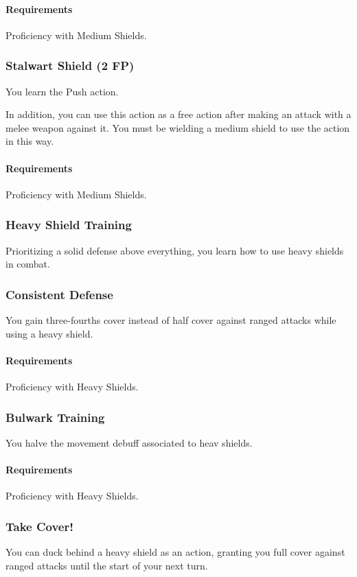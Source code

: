     \paragraph{Requirements} Proficiency with Medium Shields.
\subsubsection{Stalwart Shield (2 FP)} \label{feat::stalwartshield}
    You learn the Push action.

    In addition, you can use this action as a free action after making an attack with a melee weapon against it.
    You must be wielding a medium shield to use the action in this way.
    \paragraph{Requirements} Proficiency with Medium Shields.
\subsubsection{Heavy Shield Training} \label{feat::heavyshieldtraining}
    Prioritizing a solid defense above everything, you learn how to use heavy shields in combat.
\subsubsection{Consistent Defense} \label{feat::consistentefense}
    You gain three-fourths cover instead of half cover against ranged attacks while using a heavy shield.
    \paragraph{Requirements} Proficiency with Heavy Shields.
\subsubsection{Bulwark Training} \label{feat::bulwarktraining}
    You halve the movement debuff associated to heav shields.
    \paragraph{Requirements} Proficiency with Heavy Shields.
\subsubsection{Take Cover!} \label{feat::takecover}
    You can duck behind a heavy shield as an action, granting you full cover against ranged attacks until the start of your next turn.


